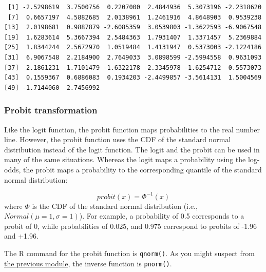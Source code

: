 \documentclass[
  13,
  letterpaper,
]{report}
\begin{document}
\begin{verbatim}
 [1] -2.5298619  3.7500756  0.2207000  2.4844936  5.3073196 -2.2318620
 [7]  0.6657197  4.5882685  2.0138961  1.2461916  4.8648903  0.9539238
[13]  2.0198681  0.9887879 -2.6085359  3.0539803 -1.3622593 -6.9067548
[19]  1.6283614  5.3667394  2.5484363  1.7931407  1.3371457  5.2369884
[25]  1.8344244  2.5672970  1.0519484  1.4131947  0.5373003 -2.1224186
[31]  6.9067548  2.2184900  2.7649033  3.0898599 -2.5994558  0.9631093
[37]  2.1861231 -1.7101479 -1.6322178 -2.3345978 -1.6254712  0.5573073
[43]  0.1559367  0.6886083  0.1934203 -2.4499857 -3.5614131  1.5004569
[49] -1.7144060  2.7456992
\end{verbatim}

\subsubsection{Probit transformation}\label{sec-trans-common-lp-probit}

Like the logit function, the probit function maps probabilities to the
real number line. However, the probit function uses the CDF of the
standard normal distribution instead of the logit function. The logit
and the probit can be used in many of the same situations. Whereas the
logit maps a probability using the log-odds, the probit maps a
probability to the corresponding quantile of the standard normal
distribution:

\[probit\left(x\right)=\Phi^{-1}\left(x\right)\] where \(\Phi\) is the
CDF of the standard normal distribution (i.e.,
\(Normal\left(\mu=1,\sigma=1\right)\)). For example, a probability of
0.5 corresponds to a probit of 0, while probabilities of 0.025, and
0.975 correspond to probits of -1.96 and +1.96.

The R command for the probit function is \texttt{qnorm()}. As you might
suspect from \href{@sec-dist-norm-r}{the previous module}, the inverse
function is \texttt{pnorm()}.
\end{document}
